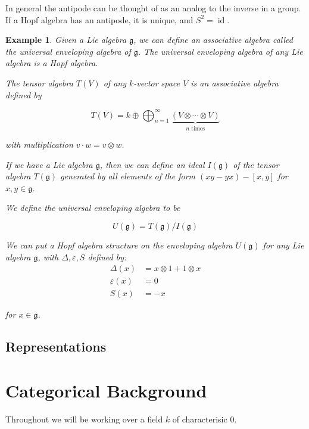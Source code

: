 \documentclass[]{article}
\newtheorem{example}[theorem]{Example}
\newcommand{\id}{\operatorname{id}}
\numberwithin{equation}{subsection}
\begin{document}
In general the antipode can be thought of as an analog to the inverse in a
group. If a Hopf algebra has an antipode, it is unique, and $S^2 = \id$.

\begin{example}
    Given a Lie algebra $\mathfrak{g}$, we can define an associative algebra
    called the \emph{universal enveloping algebra} of $\mathfrak{g}$. The
    universal enveloping algebra of any Lie algebra is a Hopf algebra.

    The \emph{tensor algebra} $T(V)$ of any $k$-vector space $V$ is an associative
    algebra defined by

    \begin{equation}
        T(V) = k \oplus \bigoplus_{n=1}^\infty \underbrace{(V \otimes \cdots \otimes V)}_{\text{$n$ times}}
    \end{equation}

    with multiplication $v \cdot w = v \otimes w$.


    If we have a Lie algebra $\mathfrak{g}$, then we can define an ideal
    $I(\mathfrak{g})$ of the tensor algebra $T(\mathfrak{g})$ generated by all
    elements of the form $(xy - yx) - \left[ x,y \right]$ for $x,y \in
    \mathfrak{g}$.

    We define the universal enveloping algebra to be 

    \begin{equation}
        U(\mathfrak{g}) = T(\mathfrak{g}) / I(\mathfrak{g})
    \end{equation}

    We can put a Hopf algebra structure on the enveloping algebra
    $U(\mathfrak{g})$ for any Lie algebra $\mathfrak{g}$, with $\Delta,
    \varepsilon, S$ defined by: 
    \begin{align}
        \Delta(x) &= x \otimes 1 + 1 \otimes x \\
        \varepsilon(x) &= 0 \\
        S(x) &= -x  
    \end{align}

    for $x \in \mathfrak{g}$.

\end{example}
\subsection{Representations}

\section{Categorical Background}
Throughout we will be working over a field $k$ of characterisic 0.
\end{document}
